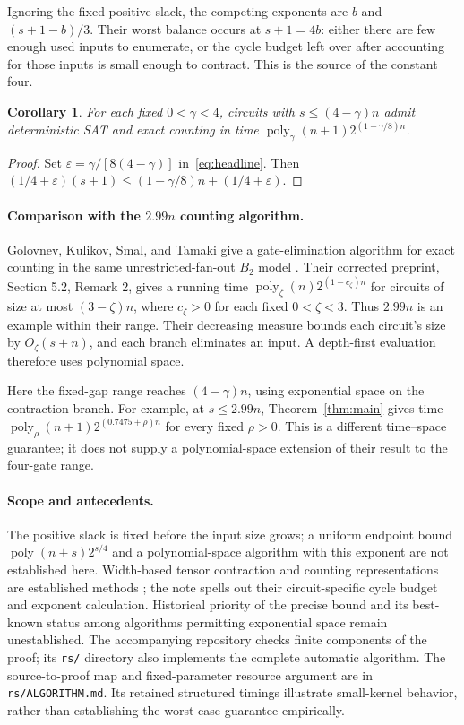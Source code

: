 \documentclass[11pt]{article}
\newtheorem{corollary}[theorem]{Corollary}
\newcommand{\poly}{\operatorname{poly}}
\begin{document}
Ignoring the fixed positive slack, the competing exponents are
$b$ and $(s+1-b)/3$. Their worst balance occurs at $s+1=4b$:
either there are few enough used inputs to enumerate, or the cycle
budget left over after accounting for those inputs is small enough
to contract. This is the source of the constant four.

\begin{corollary}\label{cor:four}
For each fixed $0<\gamma<4$, circuits with $s\le(4-\gamma)n$
admit deterministic SAT and exact counting in time
$\poly_\gamma(n+1)2^{(1-\gamma/8)n}$.
\end{corollary}
\begin{proof}
Set $\varepsilon=\gamma/[8(4-\gamma)]$ in~\eqref{eq:headline}.
Then $(1/4+\varepsilon)(s+1)\le(1-\gamma/8)n+(1/4+\varepsilon)$.
\end{proof}

\paragraph{Comparison with the $2.99n$ counting algorithm.}
Golovnev, Kulikov, Smal, and Tamaki give a gate-elimination algorithm
for exact counting in the same unrestricted-fan-out $B_2$ model
\citep{GKST2018}. Their corrected preprint, Section 5.2, Remark 2,
gives a running time $\poly_\zeta(n)2^{(1-c_\zeta)n}$ for circuits of
size at most $(3-\zeta)n$, where $c_\zeta>0$ for each fixed
$0<\zeta<3$. Thus $2.99n$ is an example within their range.
Their decreasing measure bounds each circuit's size by
$O_\zeta(s+n)$, and each branch eliminates an input. A depth-first
evaluation therefore uses polynomial space.

Here the fixed-gap range reaches $(4-\gamma)n$, using exponential
space on the contraction branch. For example, at $s\le2.99n$,
Theorem~\ref{thm:main} gives time
$\poly_\rho(n+1)2^{(0.7475+\rho)n}$ for every fixed $\rho>0$.
This is a different time--space guarantee; it does not supply a
polynomial-space extension of their result to the four-gate range.

\paragraph{Scope and antecedents.}
The positive slack is fixed before the input size grows; a uniform
endpoint bound
$\poly(n+s)2^{s/4}$ and a polynomial-space algorithm with this
exponent are not established here. Width-based tensor contraction
and counting representations are established methods
\citep{MarkovShi2008,DudekDuenasOsorioVardi2020}; the note spells out
their circuit-specific cycle budget and exponent calculation.
Historical priority of the precise bound and its best-known status
among algorithms permitting exponential space remain unestablished.
The accompanying repository checks finite components of the proof;
its \texttt{rs/} directory also implements the complete automatic
algorithm. The source-to-proof map and fixed-parameter resource
argument are in \texttt{rs/ALGORITHM.md}. Its retained structured
timings illustrate small-kernel behavior, rather than establishing
the worst-case guarantee empirically.




\end{document}
